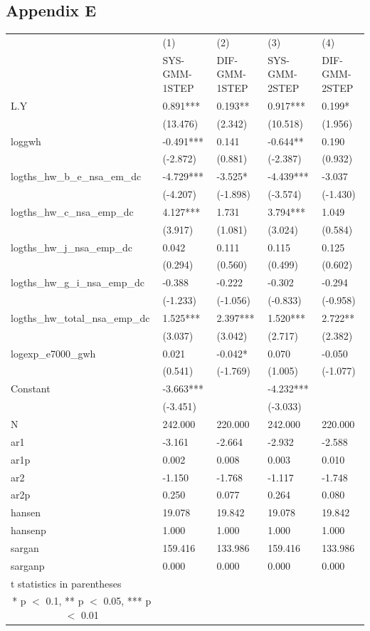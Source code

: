 \documentclass[12pt]{article}
\begin{document}
\subsection{Appendix E}
\begin{tabular}{ p{5.2cm} p{2cm} p{2cm} p{2cm} p{2cm} }

  \hline
   &(1)&(2)&(3)&(4)\\
   &\footnotesize{SYS-GMM-1STEP}&\footnotesize{DIF-GMM-1STEP}&\footnotesize{SYS-GMM-2STEP}&\footnotesize{DIF-GMM-2STEP}\\
 \hline
 L.Y&0.891***&0.193**&0.917***&0.199*\\
  &(13.476)&(2.342)&(10.518)&(1.956)\\
 loggwh&-0.491***&0.141&-0.644**&0.190\\
  &(-2.872)&(0.881)&(-2.387)&(0.932)\\
logths\_hw\_b\_e\_nsa\_em\_dc&-4.729***&-3.525*&-4.439***&-3.037\\
  &(-4.207)&(-1.898)&(-3.574)&(-1.430)\\
logths\_hw\_c\_nsa\_emp\_dc&4.127***&1.731&3.794***&1.049\\
  &(3.917)&(1.081)&(3.024)&(0.584)\\
logths\_hw\_j\_nsa\_emp\_dc&0.042&0.111&0.115&0.125\\
  &(0.294)&(0.560)&(0.499)&(0.602)\\
logths\_hw\_g\_i\_nsa\_emp\_dc&-0.388&-0.222&-0.302&-0.294\\
  &(-1.233)&(-1.056)&(-0.833)&(-0.958)\\
logths\_hw\_total\_nsa\_emp\_dc&1.525***&2.397***&1.520***&2.722**\\
  &(3.037)&(3.042)&(2.717)&(2.382)\\
logexp\_e7000\_gwh&0.021&-0.042*&0.070&-0.050\\
  &(0.541)&(-1.769)&(1.005)&(-1.077)\\
 Constant&-3.663***& &-4.232***& \\
 &(-3.451)& &(-3.033)& \\
 \hline
N&242.000&220.000&242.000&220.000\\
ar1&-3.161&-2.664&-2.932&-2.588\\
ar1p&0.002&0.008&0.003&0.010\\
ar2&-1.150&-1.768&-1.117&-1.748\\
ar2p&0.250&0.077&0.264&0.080\\
hansen&19.078&19.842&19.078&19.842\\
hansenp&1.000&1.000&1.000&1.000\\
sargan&159.416&133.986&159.416&133.986\\
sarganp&0.000&0.000&0.000&0.000\\
 \hline
 t statistics in parentheses\\
\multicolumn{1}{c}{* p $<$ 0.1, ** p $<$ 0.05, *** p $<$ 0.01} \\
\end{tabular}
\newpage
\end{document}
